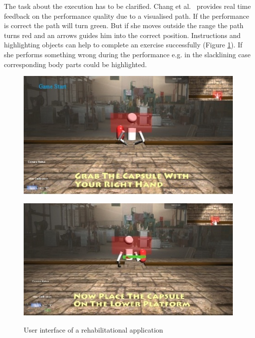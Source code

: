 The task about the execution has to be clarified. Chang et al.~\cite{Chang2012-hz} provides real time feedback on the performance quality due to a visualised path. If the performance is correct the path will turn green. But if she moves outside the range the path turns red and an arrows guides him into the correct position. Instructions and highlighting objects can help to complete an exercise successfully (Figure \ref{fig:gameUIChang}). If she performs something wrong during the performance e.g. in the slacklining case corresponding body parts could be highlighted.
\begin{figure}[htb]
	\centering
	\begin{minipage}[t]{0.49\linewidth}
		\centering
		\includegraphics[width=1\linewidth]{Pictures/gameInstruction}
		\label{fig:gameInstruction}
	\end{minipage}
	\hfill
	\begin{minipage}[t]{0.49\linewidth}
		\centering
		\includegraphics[width=1\linewidth]{Pictures/gameHighlighting}
		\label{fig:gameHighlighting}
	\end{minipage}
	\caption{User interface of a rehabilitational application~\cite{Chang2012-hz}}
	\label{fig:gameUIChang}
\end{figure}

